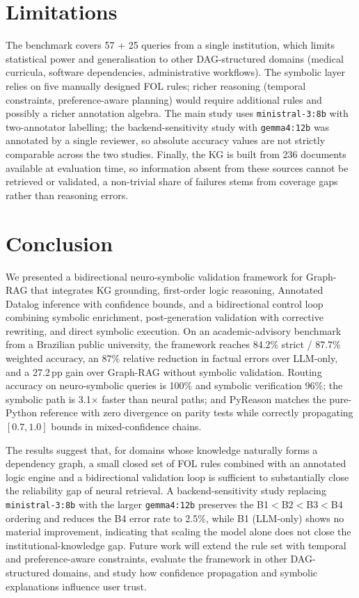 \documentclass[12pt]{article}
\begin{document}
\section{Limitations}

The benchmark covers 57 + 25 queries from a single institution, which limits statistical power and generalisation to other DAG-structured domains (medical curricula, software dependencies, administrative workflows). The symbolic layer relies on five manually designed FOL rules; richer reasoning (temporal constraints, preference-aware planning) would require additional rules and possibly a richer annotation algebra. The main study uses \texttt{ministral-3:8b} with two-annotator labelling; the backend-sensitivity study with \texttt{gemma4:12b} was annotated by a single reviewer, so absolute accuracy values are not strictly comparable across the two studies. Finally, the KG is built from 236 documents available at evaluation time, so information absent from these sources cannot be retrieved or validated, a non-trivial share of failures stems from coverage gaps rather than reasoning errors.


\section{Conclusion}

We presented a bidirectional neuro-symbolic validation framework for Graph-RAG that integrates KG grounding, first-order logic reasoning, Annotated Datalog inference with confidence bounds, and a bidirectional control loop combining symbolic enrichment, post-generation validation with corrective rewriting, and direct symbolic execution. On an academic-advisory benchmark from a Brazilian public university, the framework reaches 84.2\% strict / 87.7\% weighted accuracy, an 87\% relative reduction in factual errors over LLM-only, and a 27.2\,pp gain over Graph-RAG without symbolic validation. Routing accuracy on neuro-symbolic queries is 100\% and symbolic verification 96\%; the symbolic path is 3.1$\times$ faster than neural paths; and PyReason matches the pure-Python reference with zero divergence on parity tests while correctly propagating $[0.7,1.0]$ bounds in mixed-confidence chains.

The results suggest that, for domains whose knowledge naturally forms a dependency graph, a small closed set of FOL rules combined with an annotated logic engine and a bidirectional validation loop is sufficient to substantially close the reliability gap of neural retrieval. A backend-sensitivity study replacing \texttt{ministral-3:8b} with the larger \texttt{gemma4:12b} preserves the B1$<$B2$<$B3$<$B4 ordering and reduces the B4 error rate to 2.5\%, while B1 (LLM-only) shows no material improvement, indicating that scaling the model alone does not close the institutional-knowledge gap. Future work will extend the rule set with temporal and preference-aware constraints, evaluate the framework in other DAG-structured domains, and study how confidence propagation and symbolic explanations influence user trust.
\end{document}
